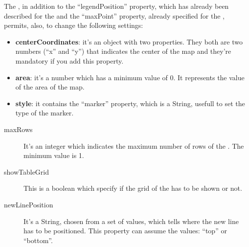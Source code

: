 		The , in addition to the “legendPosition” property, which has already been described for the  and the “maxPoint” property, already specified for the , permits, also, to change the following settings:
		\begin{itemize}
			\item \textbf{centerCoordinates}: it's an object with two properties. They both are two numbers (“x” and “y”) that indicates the center of the map and they're mandatory if you add this property.
			\item \textbf{area}: it's a number which has a minimum value of 0. It represents the value of the area of the map.
			\item \textbf{style}: it contains the “marker” property, which is a String, usefull to set the type of the marker.
		\end{itemize}
		\begin{description}
			\item[maxRows] It's an integer which indicates the maximum number of rows of the . The minimum value is 1.
			\item[showTableGrid] This is a boolean which specify if the grid of the  has to be shown or not.
			\item[newLinePosition] It's a String, chosen from a set of values, which tells where the new line has to be positioned. This property can assume the values: “top” or “bottom”.
		\end{description}

